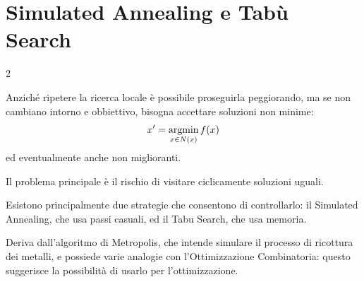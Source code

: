 \documentclass[\main/main.tex]{subfiles}
\begin{document}
\chapter{Simulated Annealing e Tabù Search}
\begin{multicols}{2}
\begin{observation}
    Anziché ripetere la ricerca locale è possibile proseguirla peggiorando, ma se non cambiano intorno e obbiettivo, bisogna accettare soluzioni non minime:
    \[
        x' = \operatorname*{argmin}_{x \in N(x)} f(x)
    \]
    ed eventualmente anche non miglioranti.
    
    Il problema principale è il rischio di visitare ciclicamente soluzioni uguali.
    
    Esistono principalmente due strategie che consentono di controllarlo: il Simulated Annealing, che usa passi casuali, ed il Tabu Search, che usa memoria.
\end{observation}
\begin{definition}
    Deriva dall'algoritmo di Metropolis, che intende simulare il processo di ricottura dei metalli, e possiede varie analogie con l'Ottimizzazione Combinatoria: questo suggerisce la possibilità di usarlo per l'ottimizzazione.


\end{definition}
\end{multicols}
\end{document}
